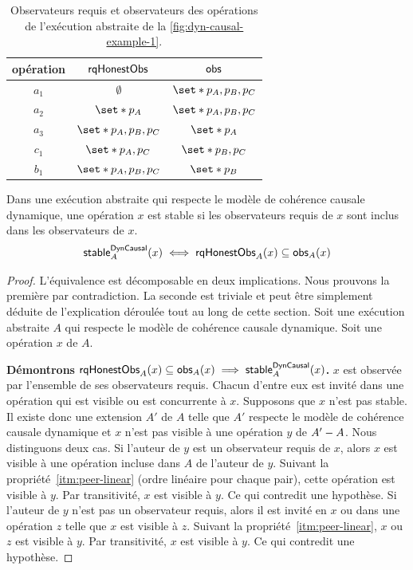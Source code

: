 \begin{table}[h!]
    \centering
    \begin{tabular}{ccc}
        opération & $\operatorname{\mathsf{rqHonestObs}}$ & $\operatorname{\mathsf{obs}}$ \\
        \toprule
        $a_1$ & $\emptyset$ & $\set*{p_A, p_B, p_C}$ \\
        $a_2$ & $\set*{p_A}$ & $\set*{p_A, p_B, p_C}$ \\
        $a_3$ & $\set*{p_A, p_B, p_C}$ & $\set*{p_A}$ \\
        $c_1$ & $\set*{p_A, p_C}$ & $\set*{p_B, p_C}$\\
        $b_1$ & $\set*{p_A, p_B, p_C}$ & $\set*{p_B}$ \\
    \end{tabular}
    \caption[Observateurs requis]{Observateurs requis et observateurs des opérations de l'exécution abstraite de la \autoref{fig:dyn-causal-example-1}.}\label{tab:rq-obs}
\end{table}

\begin{theorem}\label{th:dyn-cs}
Dans une exécution abstraite qui respecte le modèle de cohérence causale dynamique, une opération $x$ est stable si les observateurs requis de $x$ sont inclus dans les observateurs de $x$.
\begin{equation*}
    \operatorname{\mathsf{stable}}_A^{\operatorname{\mathsf{DynCausal}}}(x) \iff \operatorname{\mathsf{rqHonestObs}}_A(x) \subseteq \operatorname{\mathsf{obs}}_A(x)
\end{equation*}
\end{theorem}

\begin{proof}
L'équivalence est décomposable en deux implications.
Nous prouvons la première par contradiction.
La seconde est triviale et peut être simplement déduite de l'explication déroulée tout au long de cette section.
Soit une exécution abstraite $A$ qui respecte le modèle de cohérence causale dynamique.
Soit une opération $x$ de $A$.

\textbf{Démontrons $\operatorname{\mathsf{rqHonestObs}}_A(x) \subseteq \operatorname{\mathsf{obs}}_A(x) \implies \operatorname{\mathsf{stable}}_A^{\operatorname{\mathsf{DynCausal}}}(x)$.}
$x$ est observée par l'ensemble de ses observateurs requis.
Chacun d'entre eux est invité dans une opération qui est visible ou est concurrente à $x$.
Supposons que $x$ n'est pas stable.
Il existe donc une extension $A'$ de $A$ telle que $A'$ respecte le modèle de cohérence causale dynamique et $x$ n'est pas visible à une opération $y$ de $A' - A$.
Nous distinguons deux cas.
Si l'auteur de $y$ est un observateur requis de $x$, alors $x$ est visible à une opération incluse dans $A$ de l'auteur de $y$.
Suivant la propriété~\ref{itm:peer-linear} (ordre linéaire pour chaque pair), cette opération est visible à $y$.
Par transitivité, $x$ est visible à $y$.
Ce qui contredit une hypothèse.
Si l'auteur de $y$ n'est pas un observateur requis, alors il est invité en $x$ ou dans une opération $z$ telle que $x$ est visible à $z$.
Suivant la propriété~\ref{itm:peer-linear}, $x$ ou $z$ est visible à $y$.
Par transitivité, $x$ est visible à $y$.
Ce qui contredit une hypothèse.
\end{proof}


